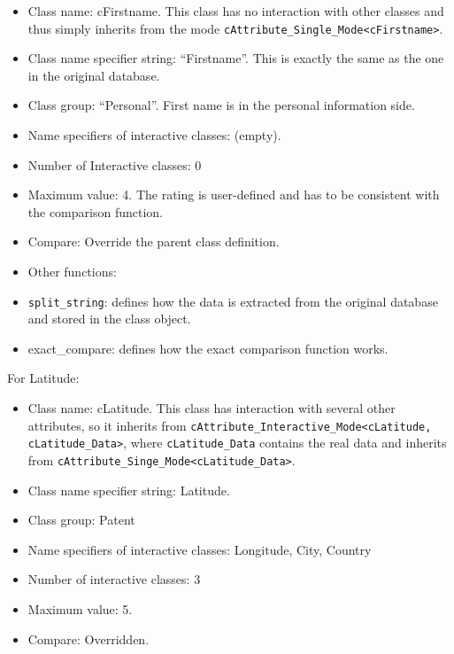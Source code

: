 \documentclass{article}
\begin{document}
\begin{itemize}

\item Class name: cFirstname. This class has no interaction 
with other classes and thus simply inherits from the mode 
\texttt{cAttribute\_Single\_Mode<cFirstname>}.

\item Class name specifier string: “Firstname”. 
This is exactly the same as the one in the original
database.

\item Class group: “Personal”. First name is in the 
personal information side.

\item Name specifiers of interactive classes: {} (empty).

\item Number of Interactive classes: 0

\item Maximum value: 4. The rating is user-defined and has to
be consistent with the comparison function.

\item Compare: Override the parent class definition.

\item Other functions:

\item \texttt{split\_string}: defines how the data is extracted 
from the original database and stored in the
class object.

\item exact\_compare: defines how the exact
comparison function works.

\end{itemize}

For Latitude:

\begin{itemize}

\item Class name: cLatitude. This class has interaction with several 
other attributes, so it inherits from 
\texttt{cAttribute\_Interactive\_Mode<cLatitude, cLatitude\_Data>},
where \texttt{cLatitude\_Data} contains the real data and inherits 
from \texttt{cAttribute\_Singe\_Mode<cLatitude\_Data>}.

\item Class name specifier string: Latitude.

\item Class group: Patent

\item Name specifiers of interactive classes:
{Longitude, City, Country}

\item Number of interactive classes: 3

\item Maximum value: 5.

\item Compare: Overridden.

\end{itemize}
\end{document}
